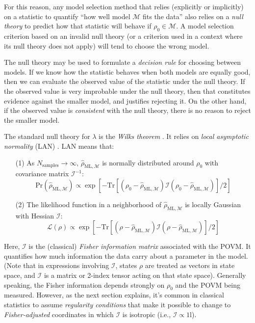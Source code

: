 \documentclass[aps,pra, twocolumn]{revtex4-1}
\newcommand{\M}{\mathcal{M}}
\newcommand{\Id}{\mathbb{I}}
\def\Id{1\!\mathrm{l}}
\newcommand{\Fi}{\mathcal{I}}
\newcommand{\rhohat}{\hat{\rho}}
\newcommand{\rhoML}[1]{\rhohat_{\scriptscriptstyle{\mathrm{ML},#1}}}
\begin{document}
For this reason, any model selection method that relies (explicitly or implicitly) on a statistic to quantify ``how well model $\M$ fits the data'' also relies on a \emph{null theory} to predict how that statistic will behave if $\rho_{0} \in \M$.  A model selection criterion based on an invalid null theory (or a criterion used in a context where its null theory does not apply) will tend to choose the wrong model.

The null theory may be used to formulate a \emph{decision rule} for choosing between models. If we know how the statistic behaves when both models are equally good, then we can evaluate the observed value of the statistic under the null theory. If the observed value is very improbable under the null theory, then that constitutes evidence against the smaller model, and justifies rejecting it. On the other hand, if the observed value is \emph{consistent} with the null theory, there is no reason to reject the smaller model.

The standard null theory for $\lambda$ is the \emph{Wilks theorem} \cite{Wilks1938}. It relies on \emph{local asymptotic normality} (LAN) \cite{LeCam1970, LeCam1956}. LAN means that:
\begin{itemize}[nosep]
\item[(1)] As $N_{\mathrm{samples}}\rightarrow \infty$,  $\rhoML{\M}$ is normally distributed around $\rho_{0}$ with covariance matrix $\Fi^{-1}$:
\begin{equation}
\label{eq:landist}
\mathrm{Pr}(\rhoML{\M}) \propto \exp\left[-\mathrm{Tr}[(\rho_{0} - \rhoML{\M})\mathcal{I}(\rho_{0} -\rhoML{\M})]/2\right]
\end{equation}
\item[(2)]The likelihood function in a neighborhood of $\rhoML{\M}$ is locally Gaussian with Hessian $\Fi$:
\begin{equation}
\label{eq:lanl}
\mathcal{L}(\rho) \propto \exp\left[-\mathrm{Tr}[(\rho - \rhoML{\M})\mathcal{I}(\rho - \rhoML{\M})]/2\right]
\end{equation}
\end{itemize}
Here, $\Fi$ is the (classical) \emph{Fisher information matrix} associated with the POVM. It quantifies how much information the data carry about a parameter in the model.  (Note that in expressions involving $\mathcal{I}$, states $\rho$ are treated as vectors in state space, and $\mathcal{I}$ is a matrix or 2-index tensor acting on that state space). Generally speaking, the Fisher information depends strongly on $\rho_{0}$ and the POVM being measured. However, as the next section explains, it's common in classical statistics to assume \emph{regularity conditions} that make it possible to change to \emph{Fisher-adjusted} coordinates in which $\mathcal{I}$ is isotropic (i.e., $\mathcal{I} \propto \Id$).
\end{document}
